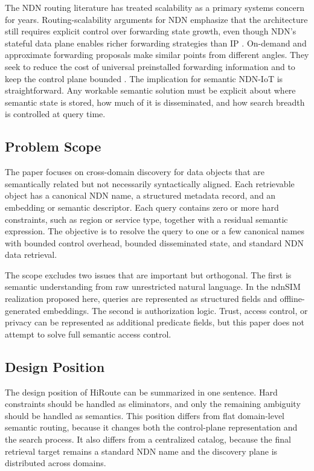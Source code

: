 \documentclass[journal]{IEEEtran}
\newcommand{\sysname}{HiRoute}
\begin{document}
The NDN routing literature has treated scalability as a primary systems concern for years. Routing-scalability arguments for NDN emphasize that the architecture still requires explicit control over forwarding state growth, even though NDN's stateful data plane enables richer forwarding strategies than IP \cite{routing_scalability,scalable_forwarding}. On-demand and approximate forwarding proposals make similar points from different angles. They seek to reduce the cost of universal preinstalled forwarding information and to keep the control plane bounded \cite{odr,samba}. The implication for semantic NDN-IoT is straightforward. Any workable semantic solution must be explicit about where semantic state is stored, how much of it is disseminated, and how search breadth is controlled at query time.

\subsection{Problem Scope}

The paper focuses on cross-domain discovery for data objects that are semantically related but not necessarily syntactically aligned. Each retrievable object has a canonical NDN name, a structured metadata record, and an embedding or semantic descriptor. Each query contains zero or more hard constraints, such as region or service type, together with a residual semantic expression. The objective is to resolve the query to one or a few canonical names with bounded control overhead, bounded disseminated state, and standard NDN data retrieval.

The scope excludes two issues that are important but orthogonal. The first is semantic understanding from raw unrestricted natural language. In the ndnSIM realization proposed here, queries are represented as structured fields and offline-generated embeddings. The second is authorization logic. Trust, access control, or privacy can be represented as additional predicate fields, but this paper does not attempt to solve full semantic access control.

\subsection{Design Position}

The design position of \sysname{} can be summarized in one sentence. Hard constraints should be handled as eliminators, and only the remaining ambiguity should be handled as semantics. This position differs from flat domain-level semantic routing, because it changes both the control-plane representation and the search process. It also differs from a centralized catalog, because the final retrieval target remains a standard NDN name and the discovery plane is distributed across domains.
\end{document}
